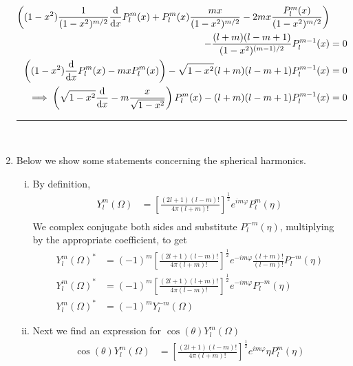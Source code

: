 \documentclass[]{book}
\begin{document}
\begin{enumerate}[1)]
\begin{equation}
\begin{split}
\left((1-x^2)\frac{1}{(1-x^2)^{m/2}}\dv{x}P_l^m(x) + P_l^m(x)\frac{mx}{(1-x^2)^{m/2}} -2mx \frac{P_l^m(x) }{(1-x^2)^{m/2}} \right) \\
-  \frac{(l+m)(l-m+1)}{(1-x^2)^{(m-1)/2}}P_l^{m-1}(x) & = 0\\
\left((1-x^2)\dv{x}P_l^m(x) - mx P_l^m(x) \right) -  \sqrt{1-x^2}(l+m)(l-m+1)P_l^{m-1}(x) & = 0\\
\implies \left(\sqrt{1-x^2}\dv{x} - m\frac{x}{ \sqrt{1-x^2}}\right)P_l^m(x) -  (l+m)(l-m+1)P_l^{m-1}(x) & = 0\\
\end{split}
\end{equation}
\noindent\rule{15cm}{0.4pt} \\
\item 
Below we show some statements concerning the spherical harmonics. \\
\begin{enumerate}[(i)]
\item
By definition,
\begin{equation}
\begin{split}
Y_l^m(\Omega) & = \left[ \frac{(2l+1)(l-m)!}{4\pi(l+m)!}\right]^{\frac{1}{2}} e^{im \varphi}P_l^m(\eta) \\
\end{split}
\end{equation}
We complex conjugate both sides and substitute $P_l^{-m}(\eta)$, multiplying by the appropriate coefficient, to get
\begin{equation}
\begin{split}
Y_l^m(\Omega)^* & = (-1)^{m}\left[ \frac{(2l+1)(l-m)!}{4\pi(l+m)!}\right]^{\frac{1}{2}} e^{-im \varphi}\frac{(l+m)!}{(l-m)!}P_l^{-m}(\eta) \\
Y_l^m(\Omega)^* & = (-1)^{m}\left[ \frac{(2l+1)(l+m)!}{4\pi(l-m)!}\right]^{\frac{1}{2}} e^{-im \varphi}P_l^{-m}(\eta) \\
Y_l^m(\Omega)^* & = (-1)^{m}Y_l^{-m}(\Omega)
\end{split}
\end{equation}
\item
Next we find an expression for $\cos(\theta) Y_l^m(\Omega) $
\begin{equation}
\begin{split}
\cos(\theta) Y_l^m(\Omega) & =  \left[ \frac{(2l+1)(l-m)!}{4\pi(l+m)!}\right]^{\frac{1}{2}} e^{im \varphi}\eta P_l^m(\eta) \\ 
\end{split}
\end{equation}

\end{enumerate}
\end{enumerate}
\end{document}
